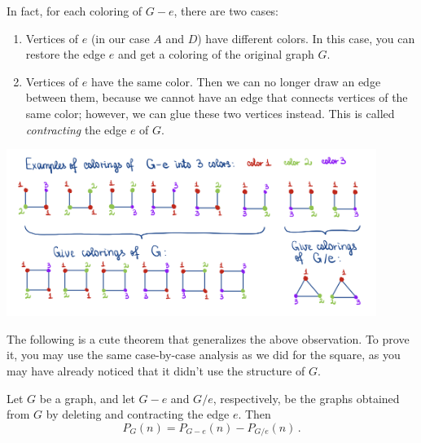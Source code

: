 In fact, for each coloring of $G-e$, there are two cases: 
\begin{enumerate}
    \item Vertices of $e$ (in our case $A$ and $D$) have different colors. In this case, you can restore the edge $e$ and get a coloring of the original graph $G$.
    \item Vertices of $e$ have the same color. Then we can no longer draw an edge between them, because we cannot have an edge that connects vertices of the same color; however, we can glue these two vertices instead. This is called \emph{contracting} the edge $e$ of $G$.
\end{enumerate}

\begin{center}
\includegraphics[width=12cm]{pics/coloring_square_cases.jpg}
\end{center}


The following is a cute theorem that generalizes the above observation. To prove it, you may use the same case-by-case analysis as we did for the square, as you may have already noticed that it didn't use the structure of $G$.

\begin{theorem}
   Let $G$ be a graph, and let $G-e$ and $G/e$, respectively, be the graphs obtained 
   from $G$ by deleting and contracting the edge $e$.
   Then
   \begin{equation*}
       P_G(n) = P_{G-e}(n) - P_{G/e}(n)\,.
   \end{equation*}
\end{theorem}

